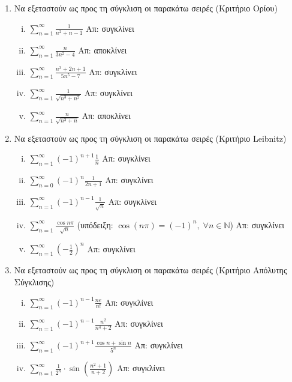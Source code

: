 \begin{enumerate}
    \item Να εξεταστούν ως προς τη σύγκλιση οι παρακάτω σειρές (Κριτήριο Ορίου)
        \begin{enumerate}[i)]
            \item $ \sum_{n=1}^{\infty} \frac{1}{n^{2}+n-1} $ \hfill Απ: συγκλίνει 
            \item $ \sum_{n=1}^{\infty} \frac{n}{3n^{2}-4}  $ \hfill Απ: αποκλίνει 
            \item $ \sum_{n=1}^{\infty} \frac{n^{3}+2n+1}{5n^{5}-7}  $ \hfill Απ: 
                συγκλίνει
            \item $ \sum_{n=1}^{\infty} \frac{1}{\sqrt{n^{3}+n^{2}}}  $ \hfill Απ: 
                συγκλίνει
            \item $ \sum_{n=1}^{\infty} \frac{n}{\sqrt{n^{3}+n}} $ \hfill Απ: 
                αποκλίνει
        \end{enumerate}

    \item Να εξεταστούν ως προς τη σύγκλιση οι παρακάτω σειρές (Κριτήριο Leibnitz)
        \begin{enumerate}[i)]
            \item $ \sum_{n=1}^{\infty} (-1)^{n+1} \frac{1}{n} $ \hfill Απ: συγκλίνει 
            \item $ \sum_{n=0}^{\infty} (-1)^{n} \frac{1}{2n+1} $ 
                \hfill Απ: συγκλίνει 
            \item $ \sum_{n=1}^{\infty} (-1)^{n-1} \frac{1}{\sqrt{n}}  $ \hfill Απ: 
                συγκλίνει
            \item $ \sum_{n=1}^{\infty} \frac{\cos{n \pi}}{\sqrt{n}} $ 
                \qquad (υπόδειξη: $ \cos{(n \pi)} = (-1)^{n}, \; \forall n 
                \in \mathbb{N}  $) \hfill Απ: συγκλίνει
            \item $ \sum_{n=1}^{\infty} \left(- \frac{1}{2}\right)^{n} $ \hfill Απ: 
                συγκλίνει
        \end{enumerate}

    \item Να εξεταστούν ως προς τη σύγκλιση οι παρακάτω σειρές (Κριτήριο Απόλυτης 
        Σύγκλισης)
        \begin{enumerate}[i)]
            \item $ \sum_{n=1}^{\infty} (-1)^{n-1} \frac{ne}{n!} $ \hfill Απ: 
                συγκλίνει
            \item $ \sum_{n=1}^{\infty} (-1)^{n-1} \frac{n^{2}}{n^{4}+2}  $ \hfill Απ: 
                συγκλίνει
            \item $ \sum_{n=1}^{\infty} (-1)^{n+1} \frac{\cos{n} + \sin{n}}{5^{n}} $ 
                \hfill Απ: συγκλίνει 
            \item $ \sum_{n=1}^{\infty} \frac{1}{2^{n}} \cdot 
                \sin{\left(\frac{n^{2}+1}{n+2}\right)}$ \hfill Απ: συγκλίνει 
        \end{enumerate}
\end{enumerate}


\vspace{\baselineskip}



